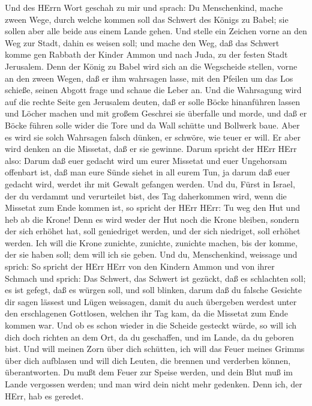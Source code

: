  Und des HErrn Wort geschah zu mir und sprach:
 Du Menschenkind, mache zween Wege, durch welche kommen
soll das Schwert des Königs zu Babel; sie sollen aber alle beide aus
einem Lande gehen.  Und stelle ein Zeichen vorne an den Weg
zur Stadt, dahin es weisen soll; und mache den Weg, daß das Schwert
komme gen Rabbath der Kinder Ammon und nach Juda, zu der festen Stadt
Jerusalem.  Denn der König zu Babel wird sich an die
Wegscheide stellen, vorne an den zween Wegen, daß er ihm wahrsagen
lasse, mit den Pfeilen um das Los schieße, seinen Abgott frage und
schaue die Leber an.  Und die Wahrsagung wird auf die
rechte Seite gen Jerusalem deuten, daß er solle Böcke hinanführen lassen
und Löcher machen und mit großem Geschrei sie überfalle und morde, und
daß er Böcke führen solle wider die Tore und da Wall schütte und
Bollwerk baue.  Aber es wird sie solch Wahrsagen falsch
dünken, er schwöre, wie teuer er will. Er aber wird denken an die
Missetat, daß er sie gewinne.  Darum spricht der HErr HErr
also: Darum daß euer gedacht wird um eurer Missetat und euer Ungehorsam
offenbart ist, daß man eure Sünde siehet in all eurem Tun, ja darum daß
euer gedacht wird, werdet ihr mit Gewalt gefangen werden. 
Und du, Fürst in Israel, der du verdammt und verurteilet bist, des Tag
daherkommen wird, wenn die Missetat zum Ende kommen ist, 
so spricht der HErr HErr: Tu weg den Hut und heb ab die Krone! Denn es
wird weder der Hut noch die Krone bleiben, sondern der sich erhöhet hat,
soll geniedriget werden, und der sich niedriget, soll erhöhet werden.
 Ich will die Krone zunichte, zunichte, zunichte machen,
bis der komme, der sie haben soll; dem will ich sie geben. 
Und du, Menschenkind, weissage und sprich: So spricht der HErr HErr von
den Kindern Ammon und von ihrer Schmach und sprich: Das Schwert, das
Schwert ist gezückt, daß es schlachten soll; es ist gefegt, daß es
würgen soll, und soll blinken,  darum daß du falsche
Gesichte dir sagen lässest und Lügen weissagen, damit du auch übergeben
werdest unter den erschlagenen Gottlosen, welchen ihr Tag kam, da die
Missetat zum Ende kommen war.  Und ob es schon wieder in
die Scheide gesteckt würde, so will ich dich doch richten an dem Ort, da
du geschaffen, und im Lande, da du geboren bist.  Und will
meinen Zorn über dich schütten, ich will das Feuer meines Grimms über
dich aufblasen und will dich Leuten, die brennen und verderben können,
überantworten.  Du mußt dem Feuer zur Speise werden, und
dein Blut muß im Lande vergossen werden; und man wird dein nicht mehr
gedenken. Denn ich, der HErr, hab es geredet.

